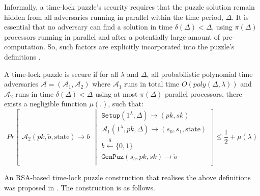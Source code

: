 Informally, a time-lock puzzle's security requires that the puzzle solution  remain hidden from all adversaries running in parallel within the time period, $\Delta$.   It is essential that no adversary can find a solution   in  time $\delta(\Delta)<\Delta$, using  $\pi(\Delta)$  processors running in parallel and after a potentially large amount of pre-computation. So, such factors are explicitly incorporated  into the puzzle's definitions \cite{BonehBBF18,MalavoltaT19,garay2019}. 
\begin{definition} A time-lock puzzle is secure if for all $\lambda$ and $\Delta$, all probabilistic polynomial time adversaries $\mathcal{A}=(\mathcal{A}_{\scriptscriptstyle 1},\mathcal{A}_{\scriptscriptstyle 2})$ where $\mathcal{A}_{\scriptscriptstyle 1}$ runs in total time $O(poly(\Delta,\lambda))$ and $\mathcal{A}_{\scriptscriptstyle 2}$ runs in  time $\delta(\Delta)<\Delta$ using at most $\pi(\Delta)$ parallel processors, there exists a negligible function $\mu(.)$, such that: 
\small{
$$ Pr\left[
  \begin{array}{l}
\mathcal{A}_{\scriptscriptstyle 2}(pk, \ddot{o},\text{state})  \rightarrow b
\end{array} \middle |
    \begin{array}{l}
\mathtt{Setup}(1^{\scriptscriptstyle\lambda},\Delta)\rightarrow (pk,sk)\\
\mathcal{A}_{\scriptscriptstyle 1}(1^{\scriptscriptstyle\lambda},pk, \Delta)\rightarrow (s_{\scriptscriptstyle 0},s_{\scriptscriptstyle 1},\text{state})\\
b\stackrel{\scriptscriptstyle\$}\leftarrow \{0,1\}\\
\mathtt {GenPuz}(s_{\scriptscriptstyle b}, pk, sk)\rightarrow \ddot{o}\\
\end{array}    \right]\leq \frac{1}{2}+\mu(\lambda)$$
}
\end{definition}






An  RSA-based time-lock puzzle construction that realises the above definitions was proposed in  \cite{Rivest:1996:TPT:888615}. The construction is as follows. 




